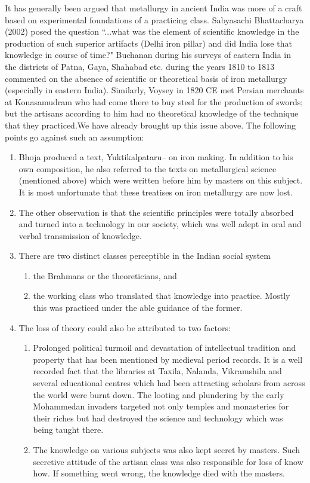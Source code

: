 It has generally been argued that metallurgy in ancient India was more of a craft based on experimental foundations of a practicing class. Sabyasachi Bhattacharya (2002) posed the question “...what was the element of scientific knowledge in the production of such superior artifacts (Delhi iron pillar) and did India lose that knowledge in course of time?" Buchanan during his surveys of eastern India in the districts of Patna, Gaya, Shahabad etc. during the years 1810 to 1813 commented on the absence of scientific or theoretical basis of iron metallurgy (especially in eastern India). Similarly, Voysey in 1820 CE met Persian merchants at Konasamudram who had come there to buy steel for the production of swords; but the artisans according to him had no theoretical knowledge of the technique that they practiced.We have already brought up this issue above. The following points go against such an assumption:

\begin{enumerate}
\item Bhoja produced a text, Yuktikalpataru– on iron making. In addition to his own composition, he also referred to the texts on metallurgical science (mentioned above) which were written before him by masters on this subject. It is most unfortunate that these treatises on iron metallurgy are now lost.
\item The other observation is that the scientific principles were totally absorbed and turned into a technology in our society, which was well adept in oral and verbal transmission of knowledge.
\item There are two distinct classes perceptible in the Indian social system 
\begin{enumerate}
\item the Brahmans or the theoreticians, and 
\item the working class who translated that knowledge into practice. Mostly this was practiced under the able guidance of the former.
\end{enumerate}
\item The loss of theory could also be attributed to two factors:
\begin{enumerate}
\item Prolonged political turmoil and devastation of intellectual tradition and property that has been mentioned by medieval period records. It is a well recorded fact that the libraries at Taxila, Nalanda, Vikramshila and several educational centres which had been attracting scholars from across the world were burnt down. The looting and plundering by the early Mohammedan invaders targeted not only temples and monasteries for their riches but had destroyed the science and technology which was being taught there.
\item The knowledge on various subjects was also kept secret by masters. Such secretive attitude of the artisan class was also responsible for loss of know how. If something went wrong, the knowledge died with the masters. 
\end{enumerate}
\end{enumerate}

